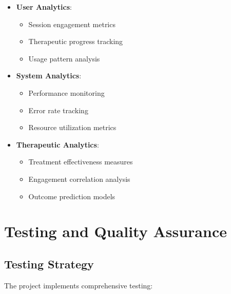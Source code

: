 \begin{itemize}
  \item \textbf{User Analytics}:
    \begin{itemize}
      \item Session engagement metrics
      \item Therapeutic progress tracking
      \item Usage pattern analysis
    \end{itemize}
    
  \item \textbf{System Analytics}:
    \begin{itemize}
      \item Performance monitoring
      \item Error rate tracking
      \item Resource utilization metrics
    \end{itemize}
    
  \item \textbf{Therapeutic Analytics}:
    \begin{itemize}
      \item Treatment effectiveness measures
      \item Engagement correlation analysis
      \item Outcome prediction models
    \end{itemize}
\end{itemize}

\section{Testing and Quality Assurance}

\subsection{Testing Strategy}
The project implements comprehensive testing:

